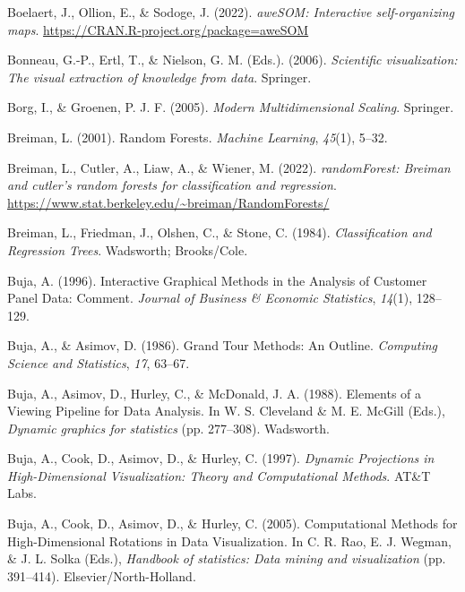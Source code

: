 \documentclass[
  letterpaper,
]{krantz}
\newlength{\cslhangindent}
\newlength{\cslentryspacingunit} %
\newenvironment{CSLReferences}[2] %
 {%
  \setlength{\parindent}{0pt}
  \ifodd #1
  \let\oldpar\par
  \def\par{\hangindent=\cslhangindent\oldpar}
  \fi
  \setlength{\parskip}{#2\cslentryspacingunit}
 }%
 {}
\begin{document}
\begin{CSLReferences}{1}{0}
\leavevmode{}%
Boelaert, J., Ollion, E., \& Sodoge, J. (2022). \emph{aweSOM:
Interactive self-organizing maps}.
\url{https://CRAN.R-project.org/package=aweSOM}

\leavevmode{}%
Bonneau, G.-P., Ertl, T., \& Nielson, G. M. (Eds.). (2006).
\emph{Scientific visualization: The visual extraction of knowledge from
data}. Springer.

\leavevmode{}%
Borg, I., \& Groenen, P. J. F. (2005). \emph{Modern {M}ultidimensional
{S}caling}. Springer.

\leavevmode{}%
Breiman, L. (2001). Random {F}orests. \emph{Machine Learning},
\emph{45}(1), 5--32.

\leavevmode{}%
Breiman, L., Cutler, A., Liaw, A., \& Wiener, M. (2022).
\emph{randomForest: Breiman and cutler's random forests for
classification and regression}.
\url{https://www.stat.berkeley.edu/~breiman/RandomForests/}

\leavevmode{}%
Breiman, L., Friedman, J., Olshen, C., \& Stone, C. (1984).
\emph{Classification and {R}egression {T}rees}. Wadsworth; Brooks/Cole.

\leavevmode{}%
Buja, A. (1996). Interactive {G}raphical {M}ethods in the {A}nalysis of
{C}ustomer {P}anel {D}ata: {C}omment. \emph{Journal of Business \&
Economic Statistics}, \emph{14}(1), 128--129.

\leavevmode{}%
Buja, A., \& Asimov, D. (1986). {G}rand {T}our {M}ethods: {A}n
{O}utline. \emph{Computing Science and Statistics}, \emph{17}, 63--67.

\leavevmode{}%
Buja, A., Asimov, D., Hurley, C., \& McDonald, J. A. (1988). {E}lements
of a {V}iewing {P}ipeline for {D}ata {A}nalysis. In W. S. Cleveland \&
M. E. McGill (Eds.), \emph{Dynamic graphics for statistics} (pp.
277--308). Wadsworth.

\leavevmode{}%
Buja, A., Cook, D., Asimov, D., \& Hurley, C. (1997). \emph{Dynamic
{P}rojections in {H}igh-{D}imensional {V}isualization: {T}heory and
{C}omputational {M}ethods}. AT\&{T} Labs.

\leavevmode{}%
Buja, A., Cook, D., Asimov, D., \& Hurley, C. (2005). {C}omputational
{M}ethods for {H}igh-{D}imensional {R}otations in {D}ata
{V}isualization. In C. R. Rao, E. J. Wegman, \& J. L. Solka (Eds.),
\emph{Handbook of statistics: Data mining and visualization} (pp.
391--414). Elsevier/North-Holland.


\end{CSLReferences}
\end{document}
